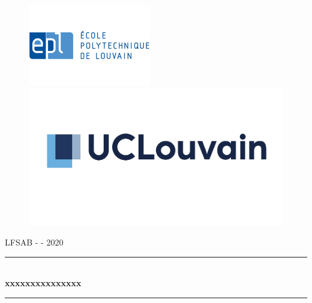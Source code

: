 
\begin{titlepage}

  \begin{sffamily}
  
  \begin{center}  
        
        \begin{figure}[h]
            \begin{minipage}[c]{0.5\textwidth}
            \flushleft
            \includegraphics[scale=0.8]{Structure/LogoEPL.jpg}
            \end{minipage}%
            \begin{minipage}[c]{0.5\textwidth}
            \includegraphics[scale=0.37]{Structure/LogoUCLouvain2.jpg}
            \flushright 
            \end{minipage}
        \end{figure}
        
\vfill

        \textsc{\LARGE LFSAB  -  -  2020}\\[0.3cm]
        \rule{16cm}{1pt}
        \medskip
        \\
        { \huge \bfseries xxxxxxxxxxxxxxx \\[0.2cm] }
        \rule{16cm}{1pt}
        \\
    

\end{center}
\end{sffamily}
\end{titlepage}

